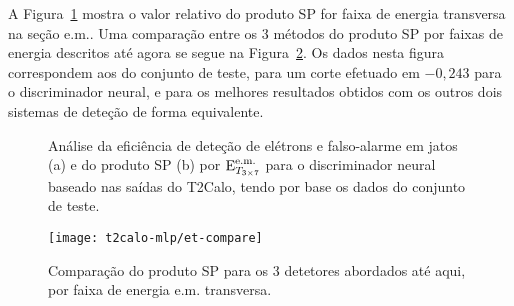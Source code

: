 

A Figura~\ref{fig:best-t2calo-test-efficiency-et} mostra o valor relativo do
produto SP for faixa de energia transversa na seção e.m.. Uma comparação entre
os 3 métodos do produto SP por faixas de energia descritos até agora se segue
na Figura~\ref{fig:best-t2calo-versus-others-emet}. Os dados nesta figura
correspondem aos do conjunto de teste, para um corte efetuado em $-0,243$ para
o discriminador neural, e para os melhores resultados obtidos com os outros
dois sistemas de deteção de forma equivalente.

\begin{figure}
\begin{center}
\end{center}
\caption{Análise da eficiência de deteção de elétrons e falso-alarme em jatos
(a) e do produto SP (b) por $\text{E}^{\text{e.m.}}_{T_{3\times7}}$ para o discriminador neural baseado nas
saídas do T2Calo, tendo por base os dados do conjunto de teste.}
\label{fig:best-t2calo-test-efficiency-et}
\end{figure}

\begin{figure}
\begin{center}
\texttt{[image: t2calo-mlp/et-compare]}
\end{center}
\caption{Comparação do produto SP para os 3 detetores abordados até aqui, por
faixa de energia e.m. transversa.}
\label{fig:best-t2calo-versus-others-emet}
\end{figure}

